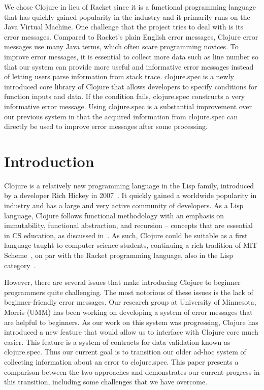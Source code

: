 \documentclass[12pt]{article}
\begin{document}
We chose Clojure in lieu of Racket since it is a functional programming language that has quickly gained popularity 
in the industry and it primarily runs on the Java Virtual Machine. One challenge that the project tries to deal with is its error messages. 
Compared to Racket’s plain English error messages, Clojure error messages use many Java terms, 
which often scare programming novices. To improve error messages, it is essential to collect more data such as line number so
that our system can provide more useful and informative error messages instead of letting users parse information from 
stack trace. clojure.spec is a newly introduced core library of Clojure that allows developers to specify conditions for function 
inputs and data. If the condition fails, clojure.spec constructs a very informative error message. Using clojure.spec is a 
substantial improvement over our previous system in that the acquired information from clojure.spec can directly be 
used to improve error messages after some processing.


\newpage
\setcounter{page}{1}

\section{Introduction}
Clojure is a relatively new programming language in the Lisp family, introduced by a developer Rich Hickey in 2007~\cite{Hickey:2008}. 
It quickly gained a worldwide popularity in industry and has a large and very active community of developers. 
As a Lisp language, Clojure follows functional methodology with an emphasis on immutability, functional abstraction, and recursion -- 
concepts that are essential in CS education, as discussed in~\cite{Felleisen:2004}. 
As such, Clojure could be suitable as a first language taught to computer science students, continuing a rich tradition of MIT Scheme~\cite{Abelson},
on par with the Racket programming language, also in the Lisp category~\cite{htdp}. 

However, there are several issues that make introducing Clojure to beginner programmers quite challenging. 
The most notorious of these issues is the lack of beginner-friendly error messages. 
Our research group at University of Minnesota, Morris (UMM) has been working on developing a system of error messages
that are helpful to beginners. 
As our work on this system was progressing, Clojure has introduced a new feature that would allow us to interface
with Clojure core much easier. 
This feature is a system of contracts for data validation known as clojure.spec.
Thus our current goal is to transition our older ad-hoc system of collecting information about an error 
to clojure.spec. 
This paper presents a comparison between the two approaches and demonstrates our current progress 
in this transition, including some challenges that we have overcome. 
\end{document}

